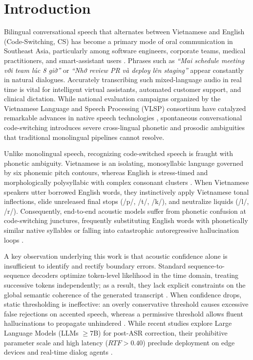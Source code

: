 \documentclass[9pt, conference, a4paper, compsocconf]{IEEEtran}
\begin{document}
\section{Introduction}
Bilingual conversational speech that alternates between Vietnamese and English (Code-Switching, CS) has become a primary mode of oral communication in Southeast Asia, particularly among software engineers, corporate teams, medical practitioners, and smart-assistant users \cite{lyu2010seame, do2023codeswitching}. Phrases such as \textit{``Mai schedule meeting với team lúc 8 giờ''} or \textit{``Nhớ review PR và deploy lên staging''} appear constantly in natural dialogues. Accurately transcribing such mixed-language audio in real time is vital for intelligent virtual assistants, automated customer support, and clinical dictation. While national evaluation campaigns organized by the Vietnamese Language and Speech Processing (VLSP) consortium \cite{vlsp2022sharedtask} have catalyzed remarkable advances in native speech technologies \cite{nguyen2024phowhisper, luong2016vivos}, spontaneous conversational code-switching introduces severe cross-lingual phonetic and prosodic ambiguities that traditional monolingual pipelines cannot resolve.

Unlike monolingual speech, recognizing code-switched speech is fraught with phonetic ambiguity. Vietnamese is an isolating, monosyllabic language governed by six phonemic pitch contours, whereas English is stress-timed and morphologically polysyllabic with complex consonant clusters \cite{le2022phonetic}. When Vietnamese speakers utter borrowed English words, they instinctively apply Vietnamese tonal inflections, elide unreleased final stops (/p/, /t/, /k/), and neutralize liquids (/l/, /r/). Consequently, end-to-end acoustic models suffer from phonetic confusion at code-switching junctures, frequently substituting English words with phonetically similar native syllables or falling into catastrophic autoregressive hallucination loops \cite{radford2023whisper, shan2019investigating}.

A key observation underlying this work is that acoustic confidence alone is insufficient to identify and rectify boundary errors. Standard sequence-to-sequence decoders optimize token-level likelihood in the time domain, treating successive tokens independently; as a result, they lack explicit constraints on the global semantic coherence of the generated transcript \cite{huang2023dynamic}. When confidence drops, static thresholding is ineffective: an overly conservative threshold causes excessive false rejections on accented speech, whereas a permissive threshold allows fluent hallucinations to propagate unhindered \cite{huang2023dynamic}. While recent studies explore Large Language Models (LLMs $\ge 7$B) for post-ASR correction, their prohibitive parameter scale and high latency ($RTF > 0.40$) preclude deployment on edge devices and real-time dialog agents \cite{park2024generative}.
\end{document}
